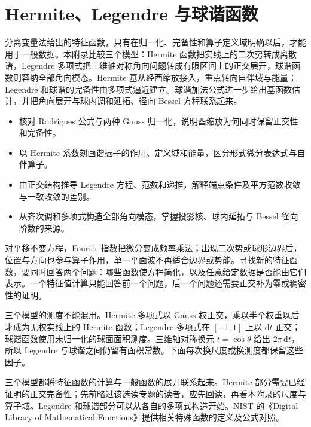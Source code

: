 \chapter{Hermite、Legendre 与球谐函数}
\label{b2:app:B}

\begin{chapterabstract}
分离变量法给出的特征函数，只有在归一化、完备性和算子定义域明确以后，才能用于一般数据。本附录比较三个模型：Hermite 函数把实线上的二次势转成离散谱，Legendre 多项式把三维轴对称角向问题转成有限区间上的正交展开，球谐函数则容纳全部角向模态。Hermite 基从经酉缩放接入，重点转向自伴域与能量；Legendre 和球谐的完备性由多项式逼近建立。球谐加法公式进一步给出基函数估计，并把角向展开与球内调和延拓、径向 Bessel 方程联系起来。
\end{chapterabstract}
\begin{learninggoals}
\begin{itemize}
\item\label{b2:item:B2-goal-hermite}核对 Rodrigues 公式与两种 Gauss 归一化，说明酉缩放为何同时保留正交性和完备性。
\item\label{b2:item:B2-goal-oscillator}以 Hermite 系数刻画谐振子的作用、定义域和能量，区分形式微分表达式与自伴算子。
\item\label{b2:item:B2-goal-legendre}由正交结构推导 Legendre 方程、范数和递推，解释端点条件及平方范数收敛与一致收敛的差别。
\item\label{b2:item:B2-goal-spherical}从齐次调和多项式构造全部角向模态，掌握投影核、球内延拓与 Bessel 径向阶数的来源。
\end{itemize}
\end{learninggoals}

对平移不变方程，Fourier 指数把微分变成频率乘法；出现二次势或球形边界后，位置与方向也参与算子作用，单一平面波不再适合边界或势能。寻找新的特征函数，要同时回答两个问题：哪些函数使方程简化，以及任意给定数据是否能由它们表示。一个特征值计算只能回答前一个问题，后一个问题还需要正交补为零或稠密性的证明。

\ProseParagraphBreak

三个模型的测度不能混用。Hermite 多项式以 Gauss 权正交，乘以半个权重以后才成为无权实线上的 Hermite 函数；Legendre 多项式在 \([-1,1]\) 上以 \(\mathrm dt\) 正交；球谐函数使用未归一化的球面面积测度。三维轴对称换元 \(t=\cos\theta\) 给出 \(2\pi\,\mathrm dt\)，所以 Legendre 与球谐之间仍留有面积常数。下面每次换尺度或换测度都保留这些因子。

\ProseParagraphBreak

三个模型都将特征函数的计算与一般函数的展开联系起来。Hermite 部分需要已经证明的正交完备性；先前略过该选读专题的读者，应先回读，再看本附录的尺度与算子域。Legendre 和球谐部分可以从各自的多项式构造开始。NIST 的《Digital Library of Mathematical Functions》\cite[Chapters 14 and 18]{NationalInstituteofStandardsNIST}提供相关特殊函数的定义及公式对照。

